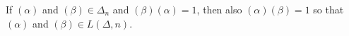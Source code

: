 If $(\alpha)$ and $(\beta) \in \Delta_n$ and $(\beta)(\alpha) = 1$, then also $(\alpha)(\beta) = 1$ so that $(\alpha)$ and $(\beta) \in L(\Delta, n)$.
